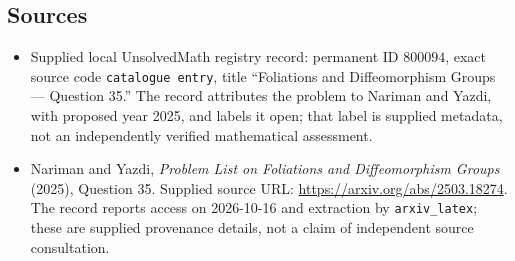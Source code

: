 \documentclass[11pt]{article}
\begin{document}
\subsection{Sources}
\begin{itemize}
\item Supplied local UnsolvedMath registry record: permanent ID \(800094\), exact source code \texttt{catalogue entry}, title ``Foliations and Diffeomorphism Groups --- Question 35.'' The record attributes the problem to Nariman and Yazdi, with proposed year 2025, and labels it open; that label is supplied metadata, not an independently verified mathematical assessment.
\item Nariman and Yazdi, \emph{Problem List on Foliations and Diffeomorphism Groups} (2025), Question 35. Supplied source URL: \url{https://arxiv.org/abs/2503.18274}. The record reports access on 2026-10-16 and extraction by \texttt{arxiv\_latex}; these are supplied provenance details, not a claim of independent source consultation.
\end{itemize}
\end{document}
